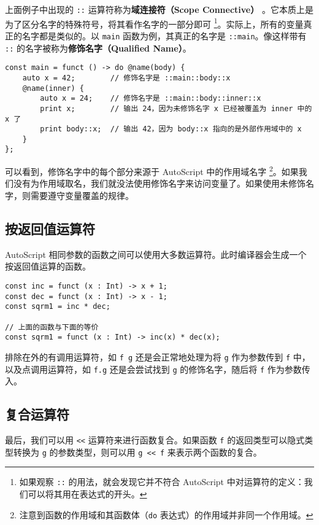 上面例子中出现的 \lstinline!::! 运算符称为\textbf{域连接符（Scope Connective）} 。它本质上是为了区分名字的特殊符号，将其看作名字的一部分即可 \footnote{如果观察 \lstinline!::! 的用法，就会发现它并不符合 AutoScript 中对运算符的定义：我们可以将其用在表达式的开头。}。实际上，所有的变量真正的名字都是类似的。以 \lstinline!main! 函数为例，其真正的名字是 \lstinline!::main!。像这样带有 \lstinline!::! 的名字被称为\textbf{修饰名字（Qualified Name）}。

\begin{lstlisting}
const main = funct () -> do @name(body) {
    auto x = 42;        // 修饰名字是 ::main::body::x
    @name(inner) {
        auto x = 24;    // 修饰名字是 ::main::body::inner::x
        print x;        // 输出 24，因为未修饰名字 x 已经被覆盖为 inner 中的 x 了
        print body::x;  // 输出 42，因为 body::x 指向的是外部作用域中的 x
    }
};
\end{lstlisting}

可以看到，修饰名字中的每个部分来源于 AutoScript 中的作用域名字 \footnote{注意到函数的作用域和其函数体（\lstinline!do! 表达式）的作用域并非同一个作用域。}。如果我们没有为作用域取名，我们就没法使用修饰名字来访问变量了。如果使用未修饰名字，则需要遵守变量覆盖的规律。 

\subsection{按返回值运算符}

AutoScript 相同参数的函数之间可以使用大多数运算符。此时编译器会生成一个按返回值运算的函数。

\begin{lstlisting}
const inc = funct (x : Int) -> x + 1;
const dec = funct (x : Int) -> x - 1;
const sqrm1 = inc * dec;

// 上面的函数与下面的等价
const sqrm1 = funct (x : Int) -> inc(x) * dec(x);
\end{lstlisting}

排除在外的有调用运算符，如 \lstinline!f g! 还是会正常地处理为将 \lstinline!g! 作为参数传到 \lstinline!f! 中，以及点调用运算符，如 \lstinline!f.g! 还是会尝试找到 \lstinline!g! 的修饰名字，随后将 \lstinline!f! 作为参数传入。 

\subsection{复合运算符}

最后，我们可以用 \lstinline!<<! 运算符来进行函数复合。如果函数 \lstinline!f! 的返回类型可以隐式类型转换为 \lstinline!g! 的参数类型，则可以用 \lstinline!g << f! 来表示两个函数的复合。

